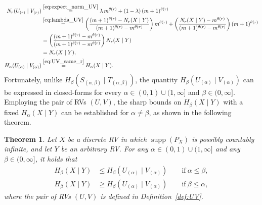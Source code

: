 \documentclass[conference, draftcls, onecolumn]{IEEEtran}
\theoremstyle{plain}
\newtheorem{theorem}{Theorem}
\newcommand{\supp}{\operatorname{supp}}
\newcommand{\defref}[1]{Definition~\ref{#1}}
\begin{document}
\begin{align}
N_{r}(U_{(r)} \mid V_{(r)})
& \overset{\eqref{eq:expect_norm_UV}}{=}
\lambda \, m^{\theta( r )} + (1-\lambda) \, (m+1)^{\theta( r )}
\\
& \overset{\eqref{eq:lambda_UV}}{=}
\bigg( \frac{ (m+1)^{\theta( r )} - N_{r}(X \mid Y) }{ (m+1)^{\theta( r )} - m^{\theta( r )} } \bigg) \, m^{\theta( r )} + \bigg( \frac{ N_{r}(X \mid Y) - m^{\theta( r )} }{ (m+1)^{\theta( r )} - m^{\theta( r )} } \bigg) \, (m+1)^{\theta( r )}
\\
& =
\bigg( \frac{ (m+1)^{\theta( r )} - m^{\theta( r )} }{ (m+1)^{\theta( r )} - m^{\theta( r )} } \bigg) \, N_{r}(X \mid Y)
\\
& =
N_{r}(X \mid Y) ,
\label{eq:UV_same_r} \\
H_{\alpha}(U_{(\alpha)} \mid V_{(\alpha)})
& \overset{\eqref{eq:UV_same_r}}{=}
H_{\alpha}(X \mid Y) .
\end{align}
Fortunately, unlike $H_{\beta}(S_{(\alpha, \beta)} \mid T_{(\alpha, \beta)})$, the quantity $H_{\beta}(U_{(\alpha)} \mid V_{(\alpha)})$ can be expressed in closed-forms for every $\alpha \in (0, 1) \cup (1, \infty]$ and $\beta \in (0, \infty]$.
Employing the pair of RVs $(U, V)$, the sharp bounds on $H_{\beta}(X \mid Y)$ with a fixed $H_{\alpha}(X \mid Y)$ can be established for $\alpha \neq \beta$, as shown in the following theorem.

\begin{theorem}
\label{th:UV}
Let $X$ be a discrete RV in which $\supp( P_{X} )$ is possibly countably infinite, and let $Y$ be an arbitrary RV.
For any $\alpha \in (0, 1) \cup (1, \infty]$ and any $\beta \in (0, \infty]$, it holds that
\begin{align}
H_{\beta}(X \mid Y)
& \le
H_{\beta}(U_{(\alpha)} \mid V_{(\alpha)})
\qquad \mathrm{if} \ \alpha \le \beta ,
\label{ineq:UV_renyi_2} \\
H_{\beta}(X \mid Y)
& \ge
H_{\beta}(U_{(\alpha)} \mid V_{(\alpha)})
\qquad \mathrm{if} \ \beta \le \alpha ,
\label{ineq:UV_renyi_1}
\end{align}
where the pair of RVs $(U, V)$ is defined in \defref{def:UV}.
\end{theorem}
\end{document}
